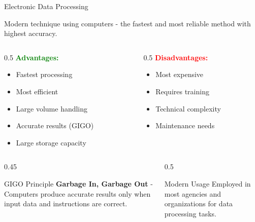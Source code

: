 \documentclass[aspectratio=169]{beamer}
\begin{document}
\begin{frame}[fragile]{Electronic Data Processing}
 \smaller
    \begin{definition}
        Modern technique using computers - the fastest and most reliable method with highest accuracy.
    \end{definition}
    
    \begin{columns}
        \begin{column}{0.5\textwidth}
            \textbf{\textcolor{green}{Advantages:}}
            \begin{itemize}
                \item[\faCheck] Fastest processing
                \item[\faCheck] Most efficient
                \item[\faCheck] Large volume handling
                \item[\faCheck] Accurate results (GIGO)
                \item[\faCheck] Large storage capacity
            \end{itemize}
        \end{column}
        \begin{column}{0.5\textwidth}
            \textbf{\textcolor{red}{Disadvantages:}}
            \begin{itemize}
                \item[\faTimes] Most expensive
                \item[\faTimes] Requires training
                \item[\faTimes] Technical complexity
                \item[\faTimes] Maintenance needs
            \end{itemize}
        \end{column}
    \end{columns}
    

    \begin{columns}
        \begin{column}{0.45\textwidth}
    \begin{block}{GIGO Principle}
       \tiny{ \textbf{Garbage In, Garbage Out} - Computers produce accurate results only when input data and instructions are correct.}
    \end{block}
    
        \end{column}
        \begin{column}{0.5\textwidth}
  \begin{exampleblock}{Modern Usage}
       \tiny{  Employed in most agencies and organizations for data processing tasks.}
    \end{exampleblock}
        \end{column}
\end{columns}
        
   
    
  
\end{frame}
\end{document}
